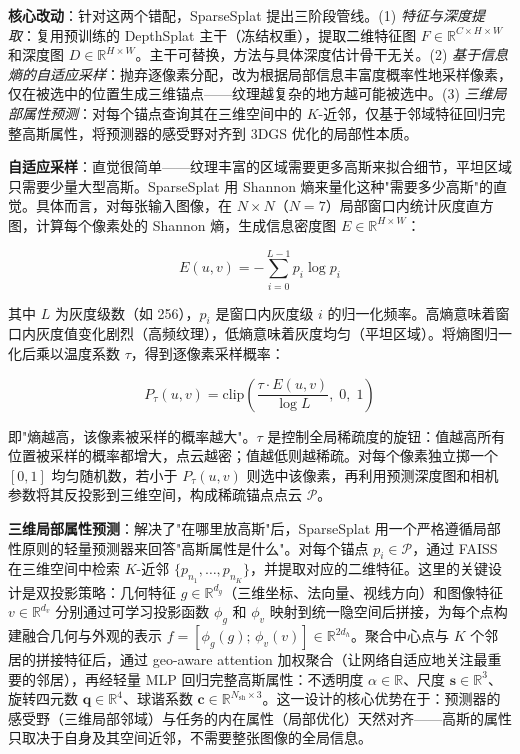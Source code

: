 \textbf{核心改动}：针对这两个错配，SparseSplat 提出三阶段管线。(1) \emph{特征与深度提取}：复用预训练的 DepthSplat 主干（冻结权重），提取二维特征图 $F \in \mathbb{R}^{C \times H \times W}$ 和深度图 $D \in \mathbb{R}^{H \times W}$。主干可替换，方法与具体深度估计骨干无关。(2) \emph{基于信息熵的自适应采样}：抛弃逐像素分配，改为根据局部信息丰富度概率性地采样像素，仅在被选中的位置生成三维锚点——纹理越复杂的地方越可能被选中。(3) \emph{三维局部属性预测}：对每个锚点查询其在三维空间中的 $K$-近邻，仅基于邻域特征回归完整高斯属性，将预测器的感受野对齐到 3DGS 优化的局部性本质。

\textbf{自适应采样}：直觉很简单——纹理丰富的区域需要更多高斯来拟合细节，平坦区域只需要少量大型高斯。SparseSplat 用 Shannon 熵来量化这种"需要多少高斯"的直觉。具体而言，对每张输入图像，在 $N \times N$（$N{=}7$）局部窗口内统计灰度直方图，计算每个像素处的 Shannon 熵，生成信息密度图 $E \in \mathbb{R}^{H \times W}$：

\begin{equation}
E(u,v) = -\sum_{i=0}^{L-1} p_i \log p_i
\end{equation}

其中 $L$ 为灰度级数（如 256），$p_i$ 是窗口内灰度级 $i$ 的归一化频率。高熵意味着窗口内灰度值变化剧烈（高频纹理），低熵意味着灰度均匀（平坦区域）。将熵图归一化后乘以温度系数 $\tau$，得到逐像素采样概率：

\begin{equation}
P_\tau(u,v) = \text{clip}\!\left(\frac{\tau \cdot E(u,v)}{\log L},\; 0,\; 1\right)
\end{equation}

即"熵越高，该像素被采样的概率越大"。$\tau$ 是控制全局稀疏度的旋钮：值越高所有位置被采样的概率都增大，点云越密；值越低则越稀疏。对每个像素独立掷一个 $[0,1]$ 均匀随机数，若小于 $P_\tau(u,v)$ 则选中该像素，再利用预测深度图和相机参数将其反投影到三维空间，构成稀疏锚点点云 $\mathcal{P}$。

\textbf{三维局部属性预测}：解决了"在哪里放高斯"后，SparseSplat 用一个严格遵循局部性原则的轻量预测器来回答"高斯属性是什么"。对每个锚点 $p_i \in \mathcal{P}$，通过 FAISS 在三维空间中检索 $K$-近邻 $\{p_{n_1}, \ldots, p_{n_K}\}$，并提取对应的二维特征。这里的关键设计是双投影策略：几何特征 $g \in \mathbb{R}^{d_g}$（三维坐标、法向量、视线方向）和图像特征 $v \in \mathbb{R}^{d_v}$ 分别通过可学习投影函数 $\phi_g$ 和 $\phi_v$ 映射到统一隐空间后拼接，为每个点构建融合几何与外观的表示 $f = [\phi_g(g);\, \phi_v(v)] \in \mathbb{R}^{2d_h}$。聚合中心点与 $K$ 个邻居的拼接特征后，通过 geo-aware attention 加权聚合（让网络自适应地关注最重要的邻居），再经轻量 MLP 回归完整高斯属性：不透明度 $\alpha \in \mathbb{R}$、尺度 $\mathbf{s} \in \mathbb{R}^3$、旋转四元数 $\mathbf{q} \in \mathbb{R}^4$、球谐系数 $\mathbf{c} \in \mathbb{R}^{N_{\text{sh}} \times 3}$。这一设计的核心优势在于：预测器的感受野（三维局部邻域）与任务的内在属性（局部优化）天然对齐——高斯的属性只取决于自身及其空间近邻，不需要整张图像的全局信息。

